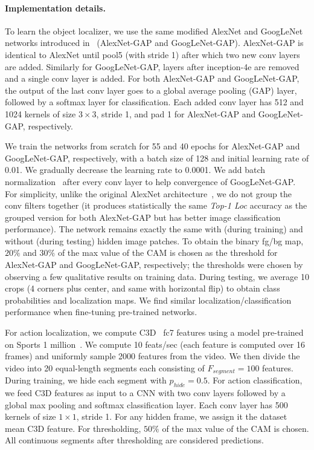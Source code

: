\vspace{-10pt}
\paragraph{Implementation details.} To learn the object localizer, we use the same modified AlexNet and GoogLeNet networks introduced in~\cite{zhou-cvpr2016} (AlexNet-GAP and  GoogLeNet-GAP).  AlexNet-GAP is identical to AlexNet until pool5 (with stride 1) after which two new conv layers are added.  Similarly for GoogLeNet-GAP, layers after inception-4e are removed and a single conv layer is added.  For both AlexNet-GAP and GoogLeNet-GAP, the output of the last conv layer goes to a global average pooling (GAP) layer, followed by a softmax layer for classification.  Each added conv layer has 512 and 1024 kernels of size $3 \times 3$, stride 1, and pad 1 for AlexNet-GAP and  GoogLeNet-GAP, respectively. 

We train the networks from scratch for 55 and 40 epochs for AlexNet-GAP and GoogLeNet-GAP, respectively, with a batch size of 128 and initial learning rate of 0.01. We gradually decrease the learning rate to 0.0001.  We add batch normalization~\cite{bn} after every conv layer to help convergence of GoogLeNet-GAP. For simplicity, unlike the original AlexNet architecture~\cite{krizhevsky-nips2012}, we do not group the conv filters together (it produces statistically the same \emph{Top-1 Loc} accuracy as the grouped version for both AlexNet-GAP but has better image classification performance). The network remains exactly the same with (during training) and without (during testing) hidden image patches. To obtain the binary fg/bg map, $20\%$ and $30\%$ of the max value of the CAM is chosen as the threshold for AlexNet-GAP and GoogLeNet-GAP, respectively; the thresholds were chosen by observing a few qualitative results on training data.  During testing, we average 10 crops (4 corners plus center, and same with horizontal flip) to obtain class probabilities and localization maps.  We find similar localization/classification performance when fine-tuning pre-trained networks.

For action localization, we compute C3D~\cite{tran-iccv2015} fc7 features using a model pre-trained on Sports 1 million~\cite{karpathy-CVPR14}. We compute 10 feats/sec (each feature is computed over 16 frames) and uniformly sample 2000 features from the video. We then divide the video into 20 equal-length segments each consisting of $F_{segment} = 100$ features.  During training, we hide each segment with $p_{hide} = 0.5$.  For action classification, we feed C3D features as input to a CNN with two conv layers followed by a global max pooling and softmax classification layer. Each conv layer has 500 kernels of size $1 \times 1$, stride 1. For any hidden frame, we assign it the dataset mean C3D feature. For thresholding, $50\%$ of the max value of the CAM is chosen. All continuous segments after thresholding are considered predictions.

